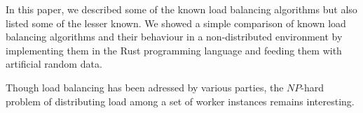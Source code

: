 In this paper, we described some of the known load balancing algorithms but also
listed some of the lesser known.
We showed a simple comparison of known load balancing algorithms and their
behaviour in a non-distributed environment by implementing them in the Rust
programming language and feeding them with artificial random data.

Though load balancing has been adressed by various parties, the $NP$-hard
problem of distributing load among a set of worker instances remains
interesting.

